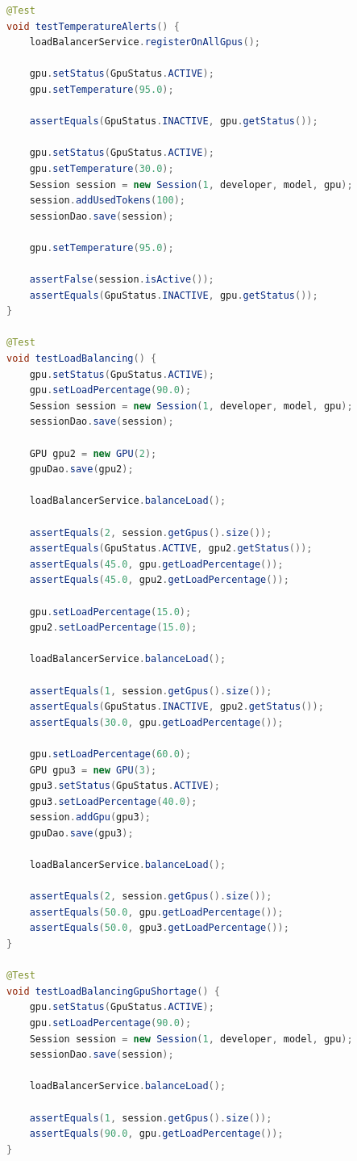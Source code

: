 \documentclass[a4paper,11pt]{report}
\begin{document}
\clearpage
\begin{lstlisting}[language=Java, caption={Code snippet of the LoadBalancerServiceTest class}, label={lst:load_balancer_service_test}]
@Test
void testTemperatureAlerts() {
	loadBalancerService.registerOnAllGpus();

	gpu.setStatus(GpuStatus.ACTIVE);
	gpu.setTemperature(95.0);

	assertEquals(GpuStatus.INACTIVE, gpu.getStatus());

	gpu.setStatus(GpuStatus.ACTIVE);
	gpu.setTemperature(30.0);
	Session session = new Session(1, developer, model, gpu);
	session.addUsedTokens(100);
	sessionDao.save(session);

	gpu.setTemperature(95.0);

	assertFalse(session.isActive());
	assertEquals(GpuStatus.INACTIVE, gpu.getStatus());
}

@Test
void testLoadBalancing() {
	gpu.setStatus(GpuStatus.ACTIVE);
	gpu.setLoadPercentage(90.0);
	Session session = new Session(1, developer, model, gpu);
	sessionDao.save(session);

	GPU gpu2 = new GPU(2);
	gpuDao.save(gpu2);

	loadBalancerService.balanceLoad();

	assertEquals(2, session.getGpus().size());
	assertEquals(GpuStatus.ACTIVE, gpu2.getStatus());
	assertEquals(45.0, gpu.getLoadPercentage());
	assertEquals(45.0, gpu2.getLoadPercentage());

	gpu.setLoadPercentage(15.0);
	gpu2.setLoadPercentage(15.0);

	loadBalancerService.balanceLoad();

	assertEquals(1, session.getGpus().size());
	assertEquals(GpuStatus.INACTIVE, gpu2.getStatus());
	assertEquals(30.0, gpu.getLoadPercentage());

	gpu.setLoadPercentage(60.0);
	GPU gpu3 = new GPU(3);
	gpu3.setStatus(GpuStatus.ACTIVE);
	gpu3.setLoadPercentage(40.0);
	session.addGpu(gpu3);
	gpuDao.save(gpu3);

	loadBalancerService.balanceLoad();

	assertEquals(2, session.getGpus().size());
	assertEquals(50.0, gpu.getLoadPercentage());
	assertEquals(50.0, gpu3.getLoadPercentage());
}

@Test
void testLoadBalancingGpuShortage() {
	gpu.setStatus(GpuStatus.ACTIVE);
	gpu.setLoadPercentage(90.0);
	Session session = new Session(1, developer, model, gpu);
	sessionDao.save(session);

	loadBalancerService.balanceLoad();

	assertEquals(1, session.getGpus().size());
	assertEquals(90.0, gpu.getLoadPercentage());
}
\end{lstlisting}
\end{document}
